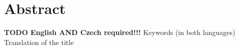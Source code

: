 \chapter*{Abstract}

\textbf{TODO English AND Czech required!!!}
Keywords (in both languages)
Translation of the title
